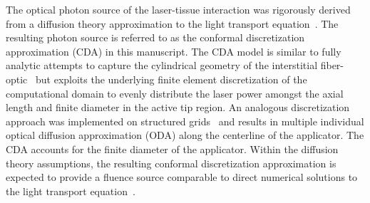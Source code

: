 \documentclass{article}
\begin{document}
The optical photon source of the laser-tissue interaction was
rigorously derived from a diffusion theory approximation to the
light transport equation~\cite{Welch95}.  The resulting photon
source is referred to as the conformal discretization approximation
(CDA) in this manuscript.  The CDA model is similar to fully
analytic attempts to capture the cylindrical geometry of the
interstitial fiber-optic~\cite{Dickey04} but exploits the
underlying finite element discretization of the computational
domain to evenly distribute the laser power amongst the axial
length and finite diameter in the active tip region.  An analogous
discretization approach was implemented on structured
grids~\cite{arnfield1989optical} and results in multiple individual
optical diffusion approximation (ODA) along the centerline of the
applicator.  The CDA accounts for the finite diameter of the
applicator.  Within the diffusion theory assumptions, the resulting
conformal discretization approximation is expected to provide a
fluence source comparable to direct numerical solutions to the
light transport equation~\cite{Mohammed05,shafirstein2004}.
\end{document}
